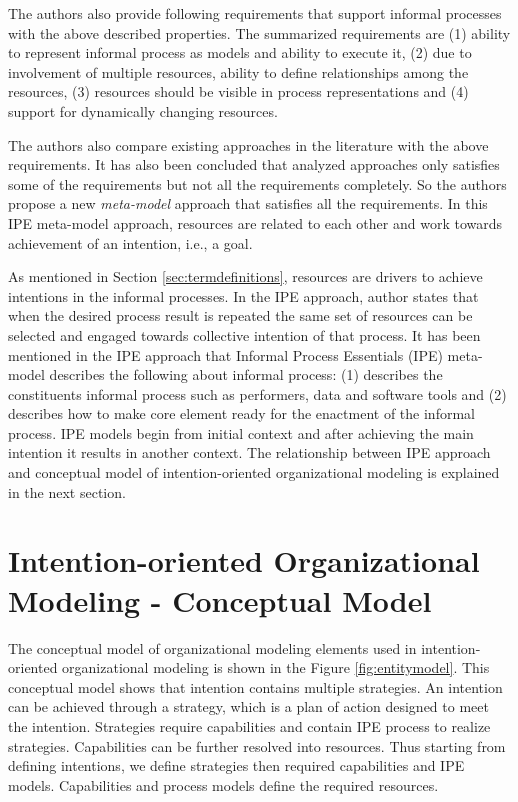 The authors also provide following requirements that support informal processes with the above described properties. The summarized requirements are (1) ability to represent informal process as models and ability to execute it, (2) due to involvement of multiple resources, ability to define relationships among the resources, (3) resources should be visible in process representations and (4) support for dynamically changing resources. 

The authors also compare existing approaches in the literature with the above requirements. It has also been concluded that analyzed approaches only satisfies some of the requirements but not all the requirements completely. So the authors propose a new \textit{meta-model} approach that satisfies all the requirements. In this IPE meta-model approach, resources are related to each other and work towards achievement of an intention, i.e., a goal.   

As mentioned in Section \ref{sec:termdefinitions}, resources are drivers to achieve intentions in the informal processes. In the IPE approach, author states that when the desired process result is repeated the same set of resources can be selected and engaged towards collective intention of that process. It has been mentioned in the IPE approach that Informal Process Essentials (IPE) meta-model describes the following about informal process: (1) describes the constituents informal process such as performers, data and software tools and (2) describes how to make core element ready for the enactment of the informal process. IPE models begin from initial context and after achieving the main intention it results in another context. The relationship between IPE approach and conceptual model of intention-oriented organizational modeling is explained in the next section.

\section{Intention-oriented Organizational Modeling - Conceptual Model}
\label{sec:entitytypesrepresentation}
The conceptual model of organizational modeling elements used in intention-oriented organizational modeling is shown in the Figure \ref{fig:entitymodel}. This conceptual model shows that intention contains multiple strategies. An intention can be achieved through a strategy, which is a plan of action designed to meet the intention. Strategies require capabilities and contain IPE process to realize strategies. Capabilities can be further resolved into resources. Thus starting from defining intentions, we define strategies then required capabilities and IPE models. Capabilities and process models define the required resources. 

